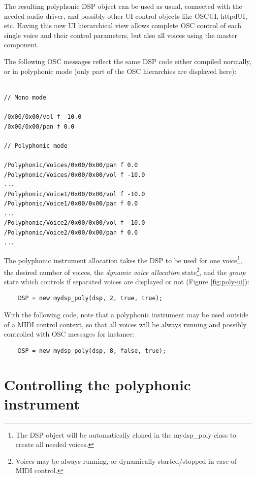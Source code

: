 The resulting polyphonic DSP object can be used as usual, connected with the needed audio driver, and possibly other UI control objects like OSCUI, httpdUI, etc. Having this new UI hierarchical view allows complete OSC control of each single voice and their control parameters, but also all voices using the master component. 

The following OSC messages reflect the same DSP code either compiled normally,  or in polyphonic mode (only part of the OSC hierarchies are displayed here):

\footnotesize
\begin{lstlisting}

// Mono mode

/0x00/0x00/vol f -10.0
/0x00/0x00/pan f 0.0

// Polyphonic mode

/Polyphonic/Voices/0x00/0x00/pan f 0.0
/Polyphonic/Voices/0x00/0x00/vol f -10.0
...
/Polyphonic/Voice1/0x00/0x00/vol f -10.0
/Polyphonic/Voice1/0x00/0x00/pan f 0.0
...
/Polyphonic/Voice2/0x00/0x00/vol f -10.0
/Polyphonic/Voice2/0x00/0x00/pan f 0.0
...
\end{lstlisting}
\normalsize

The polyphonic instrument allocation takes the DSP to be used for one voice\footnote{The DSP object will be automatically cloned in the mydsp\_poly class to create all needed voices.},  the desired number of voices, the \textit{dynamic voice allocation} state\footnote{Voices may be always running, or dynamically started/stopped in case of MIDI control.},  and the \textit{group} state which controls if separated voices are displayed or not (Figure \ref{fig:poly-ui}): 

\footnotesize
\begin{lstlisting}
    DSP = new mydsp_poly(dsp, 2, true, true);  
\end{lstlisting}
    
\normalsize
With the following code, note that a polyphonic instrument may be used outside of a MIDI control context, so that all voices will be always running and possibly controlled with OSC messages for instance:

\footnotesize
\begin{lstlisting}
    DSP = new mydsp_poly(dsp, 8, false, true);
\end{lstlisting}

\normalsize
    
\section{Controlling the polyphonic instrument}

